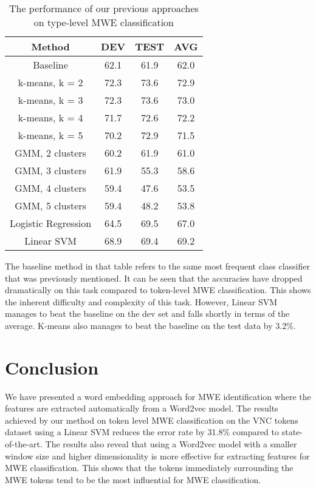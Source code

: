 \documentclass[11pt]{article}
\begin{document}
\begin{table}
\centering
\begin{tabular}{|c|c|c|c|} \hline
Method & DEV & TEST & AVG \\ \hline
Baseline & 62.1 & 61.9 & 62.0 \\ \hline
k-means, k = 2 & 72.3 & 73.6 & 72.9 \\ \hline
k-means, k = 3 & 72.3 & 73.6 & 73.0 \\ \hline
k-means, k = 4 & 71.7 & 72.6 & 72.2 \\ \hline
k-means, k = 5 & 70.2 & 72.9 & 71.5 \\ \hline
GMM, 2 clusters & 60.2 & 61.9 & 61.0  \\ \hline
GMM, 3 clusters & 61.9 & 55.3 & 58.6  \\ \hline
GMM, 4 clusters & 59.4 & 47.6 & 53.5  \\ \hline
GMM, 5 clusters & 59.4 & 48.2 & 53.8  \\ \hline
Logistic Regression & 64.5  & 69.5 &  67.0\\ \hline
Linear SVM & 68.9  &  69.4 & 69.2 \\ \hline

\end{tabular}
\caption{The performance of our previous approaches on type-level MWE classification}
\end{table}

The baseline method in that table refers to the same most frequent class classifier that was previously mentioned. It can be seen that the accuracies have dropped dramatically on this task compared to token-level MWE classification. This shows the inherent difficulty and complexity of this task. However, Linear SVM manages to beat the baseline on the dev set and falls shortly in terms of the average. K-means also manages to beat the baseline on the test data by 3.2\%.

\section{Conclusion}


We have presented a word embedding approach for MWE identification where the features are extracted automatically from a Word2vec model. The results achieved by our method on token level MWE classification on the VNC tokens dataset using a Linear SVM reduces the error rate by 31.8\% compared to state-of-the-art. The results also reveal that using a Word2vec model with a smaller window size and higher dimensionality is more effective for extracting features for MWE classification. This shows that the tokens immediately surrounding the MWE tokens tend to be the most influential for MWE classification. 
\end{document}
